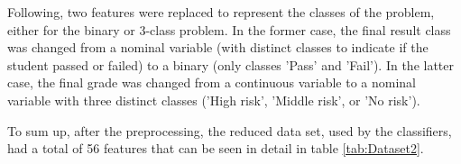\begin{table}[hbt]
\centering
{}
\caption{Percentage of missing values of last weeks' features}
\label{tab:featmiss}
\end{table}

Following, two features were replaced to represent the classes of the problem, either for the binary or 3-class problem. In the former case, the final result class was changed from a nominal variable (with distinct classes to indicate if the student passed or failed) to a binary (only classes 'Pass' and 'Fail'). In the latter case, the final grade was changed from a continuous variable to a nominal variable with three distinct classes ('High risk', 'Middle risk', or 'No risk').

To sum up, after the preprocessing, the reduced data set, used by the classifiers, had a total of 56 features that can be seen in detail in table \ref{tab:Dataset2}.


